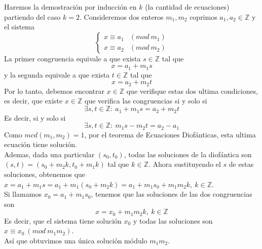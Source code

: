 \documentclass{report}
\begin{document}
\begin{myproof}
    Haremos la demostración por inducción en $k$ (la cantidad de ecuaciones) partiendo del caso $k=2$. Consideremos dos enteros $m_1,m_2$ coprimos $a_1,a_2\in\mathbb{Z}$ y el sistema $$\begin{cases} x\equiv a_{1} & ( mod\ m_{1})\\ x\equiv a_{2} & ( mod\ m_{2}) \end{cases}$$La primer congruencia equivale a que exista $s\in\mathbb{Z}$ tal que $$x=a_1+m_1s$$ y la segunda equivale a que exista $t\in\mathbb{Z}$ tal que $$x=a_2+m_2t$$Por lo tanto, debemos encontrar $x\in\mathbb{Z}$ que verifique estas dos ultima condiciones, es decir, que existe $x\in\mathbb{Z}$ que verifica las congruencias si y solo si $$\exists s,t\in\mathbb{Z}:\ a_1+m_1s=a_2+m_2t$$Es decir, si y solo si $$\exists s,t\in\mathbb{Z}:\ m_1s-m_2t=a_2-a_1$$Como $mcd(m_1,m_2)=1$, por el teorema de Ecuaciones Diofánticas, esta ultima ecuación tiene solución.\\
    Ademas, dada una particular $(s_0,t_0)$, todas las soluciones de la diofántica son $(s,t)=(s_0+m_2k,t_0+m_1k)$ tal que $k\in\mathbb{Z}$. Ahora sustituyendo el $s$ de estas soluciones, obtenemos que $x=a_1+m_1s=a_1+m_1(s_0+m_2k)=a_1+m_1s_0+m_1m_2k,\ k\in\mathbb{Z}$.\\
    Si llamamos $x_0=a_1+m_1s_0$, tenemos que las soluciones de las dos congruencias son $$x=x_0+m_1m_2k,\ k\in\mathbb{Z}$$Es decir, que el sistema tiene solución $x_0$ y todas las soluciones son $x\equiv x_0\ (mod\ m_1m_2)$.\\
    Así que obtuvimos una única solución módulo $m_1m_2$.\\

\end{myproof}
\end{document}
